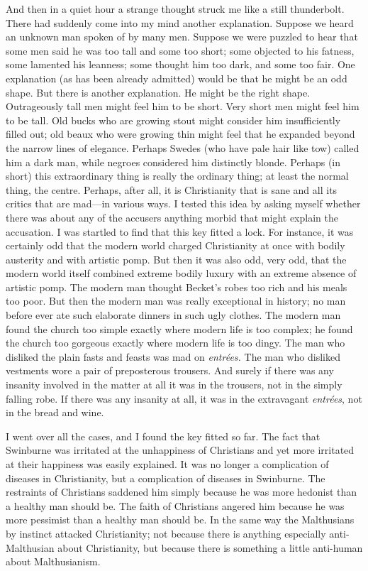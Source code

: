 \documentclass{book}
\begin{document}
And then in a quiet hour a strange thought struck me like a still thunderbolt. There had suddenly come into my mind another explanation. Suppose we heard an unknown man spoken of by many men. Suppose we were puzzled to hear that some men said he was too tall and some too short; some objected to his fatness, some lamented his leanness; some thought him too dark, and some too fair. One explanation (as has been already admitted) would be that he might be an odd shape. But there is another explanation. He might be the right shape. Outrageously tall men might feel him to be short. Very short men might feel him to be tall. Old bucks who are growing stout might consider him insufficiently filled out; old beaux who were growing thin might feel that he expanded beyond the narrow lines of elegance. Perhaps Swedes (who have pale hair like tow) called him a dark man, while negroes considered him distinctly blonde. Perhaps (in short) this extraordinary thing is really the ordinary thing; at least the normal thing, the centre. Perhaps, after all, it is Christianity that is sane and all its critics that are mad—in various ways. I tested this idea by asking myself whether there was about any of the accusers anything morbid that might explain the accusation. I was startled to find that this key fitted a lock. For instance, it was certainly odd that the modern world charged Christianity at once with bodily austerity and with artistic pomp. But then it was also odd, very odd, that the modern world itself combined extreme bodily luxury with an extreme absence of artistic pomp. The modern man thought Becket’s robes too rich and his meals too poor. But then the modern man was really exceptional in history; no man before ever ate such elaborate dinners in such ugly clothes. The modern man found the church too simple exactly where modern life is too complex; he found the church too gorgeous exactly where modern life is too dingy. The man who disliked the plain fasts and feasts was mad on \emph{entrées.} The man who disliked vestments wore a pair of preposterous trousers. And surely if there was any insanity involved in the matter at all it was in the trousers, not in the simply falling robe. If there was any insanity at all, it was in the extravagant \emph{entrées}, not in the bread and wine.

I went over all the cases, and I found the key fitted so far. The fact that Swinburne was irritated at the unhappiness of Christians and yet more irritated at their happiness was easily explained. It was no longer a complication of diseases in Christianity, but a complication of diseases in Swinburne. The restraints of Christians saddened him simply because he was more hedonist than a healthy man should be. The faith of Christians angered him because he was more pessimist than a healthy man should be. In the same way the Malthusians by instinct attacked Christianity; not because there is anything especially anti-Malthusian about Christianity, but because there is something a little anti-human about Malthusianism.
\end{document}
